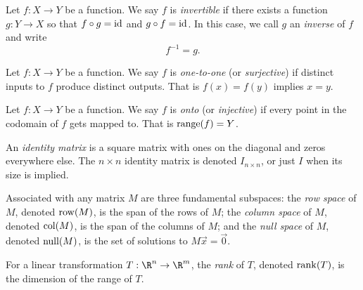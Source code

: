 \begin{SaveDefinition}[
	key=InverseFunction,
	title={Inverse Function}]
		
	Let $f:X\to Y$ be a function. We say $f$ is \emph{invertible} if
	there exists a function $g:Y\to X$ so that $f\circ g=\operatorname{\operatorname{id}}$ and $g\circ f=\operatorname{\operatorname{id}}$.
	In this case, we call $g$ an \emph{inverse} of $f$ and write
	\[
		f^{-1}=g.
	\]
\end{SaveDefinition}

\begin{SaveDefinition}[
	key=Onetoone,
	title={One-to-one}]
		
	Let $f:X\to Y$ be a function. We say $f$ is \emph{one-to-one} (or \emph{surjective}) if
	distinct inputs to $f$ produce distinct outputs. That is $f(x)=f(y)$ implies $x=y$.
\end{SaveDefinition}

\begin{SaveDefinition}[
	key=Onto,
	title={Onto}]
		
	Let $f:X\to Y$ be a function.
	We say $f$ is \emph{onto} (or \emph{injective}) if every point in the codomain of $f$ gets mapped to.
	That is $\operatorname{range}(f)=Y$.
\end{SaveDefinition}

\begin{SaveDefinition}[
	key=IdentityMatrix,
	title={Identity Matrix}]
	
	An \emph{identity matrix} is a square matrix with ones on the diagonal
	and zeros everywhere else. The $n\times n$ identity matrix is denoted $I_{n\times n}$,
	or just $I$ when its size is implied.
\end{SaveDefinition}

\begin{SaveDefinition}[key=FundamentalSubspaces, title={Fundamental Subspaces}]
	Associated with any matrix $M$ are three fundamental subspaces: the
	\emph{row space} of $M$, denoted $\operatorname{row}(M)$, is the span of the rows of
	$M$; the
	\emph{column space} of $M$, denoted $\operatorname{col}(M)$, is the span of the
	columns of $M$; and the
	\emph{null space} of $M$, denoted $\operatorname{null}(M)$, is the set of solutions to
	$M\vec x=\vec 0$.
\end{SaveDefinition}

\begin{SaveDefinition}[key=RankofaLinearTransformation, title={Rank of a Linear Transformation}]
	For a linear transformation $T:\R^n\to \R^m$, the
	\emph{rank} of $T$, denoted $\operatorname{rank}(T)$, is the dimension of the range of
	$T$.
\end{SaveDefinition}

